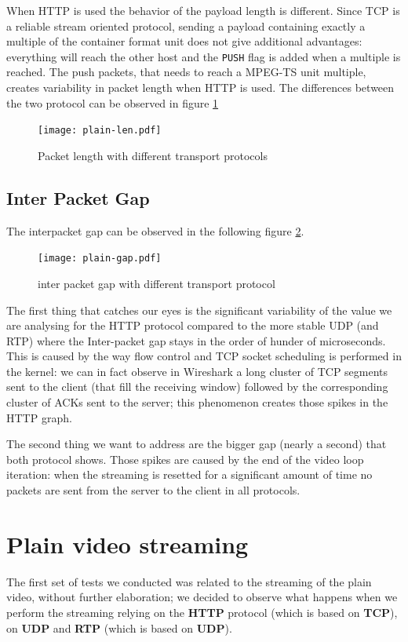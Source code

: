 \documentclass{exam}
\begin{document}
When HTTP is used the behavior of the payload length is different. Since TCP is a reliable stream oriented protocol, sending a payload containing exactly a multiple of the container format unit does not give additional advantages: everything will reach the other host and the \verb|PUSH| flag is added when a multiple is reached. The push packets, that needs to reach a MPEG-TS unit multiple, creates variability in packet length when HTTP is used.
The differences between the two protocol can be observed in figure \ref{fig:plain-len}

\begin{figure}[H]
    \centering
    \texttt{[image: plain-len.pdf]}
    \caption{Packet length with different transport protocols}
    \label{fig:plain-len}
\end{figure}

\subsection{Inter Packet Gap}

The interpacket gap can be observed in the following figure \ref{fig:plain-gap}.

\begin{figure}[H]
    \centering
    \texttt{[image: plain-gap.pdf]}
    \caption{inter packet gap with different transport protocol}
    \label{fig:plain-gap}
\end{figure}

The first thing that catches our eyes is the significant variability of the value we are analysing for the HTTP protocol compared to the more stable UDP (and RTP) where the Inter-packet gap stays in the order of hunder of microseconds. This is caused by the way flow control and TCP socket scheduling is performed in the kernel: we can in fact observe in Wireshark a long cluster of TCP segments sent to the client (that fill the receiving window)  followed by the corresponding cluster of ACKs sent to the server; this phenomenon creates those spikes in the HTTP graph. 

The second thing we want to address are the bigger gap (nearly a second) that both protocol shows. Those spikes are caused by the end of the video loop iteration: when the streaming is resetted for a significant amount of time no packets are sent from the server to the client in all protocols.

\section{Plain video streaming}
The first set of tests we conducted was related to the streaming of the plain video, without further elaboration; we decided to observe what happens when we perform the streaming relying on the \textbf{HTTP} protocol (which is based on \textbf{TCP}), on \textbf{UDP} and \textbf{RTP} (which is based on \textbf{UDP}).
\end{document}

